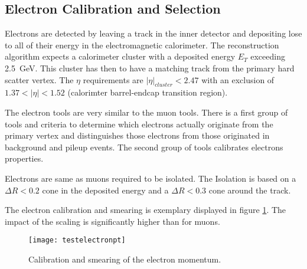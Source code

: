 \subsection{Electron Calibration and Selection}


Electrons are detected by leaving a track in the inner detector and depositing lose to all of their energy in the electromagnetic calorimeter. The reconstruction algorithm expects a calorimeter cluster with a deposited energy $E_T$ exceeding \SI{2.5}{\GeV}. This cluster has then to have a matching track from the primary hard scatter vertex. The $\eta$ requirements are $|\eta|_{cluster} < 2.47$ with an exclusion of $\num{1.37} < |\eta| < \num{1.52}$ (calorimter barrel-endcap transition region).


The electron tools are very similar to the muon tools. There is a first group of tools and criteria to determine which electrons actually originate from the primary vertex and distinguishes those electrons from those originated in background and pileup events. The second group of tools calibrates electrons properties.

Electrons are same as muons required to be isolated. The Isolation is based on a $\Delta R < \num{0.2}$ cone in the deposited energy and a $\Delta R < \num{0.3}$ cone around the track.

The electron calibration and smearing is exemplary displayed in figure \ref{fig:testelectronpt}. The impact of the scaling is significantly higher than for muons.

\begin{figure}
\centering
\texttt{[image: testelectronpt]}
\caption[Calibration and Smearing of the electron momentum]{Calibration and smearing of the electron momentum.}
\label{fig:testelectronpt}
\end{figure}